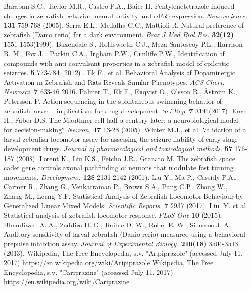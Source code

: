 \documentclass[a4paper,12pt]{article}
\begin{document}
\begin{thebibliography}{99}
Baraban S.C., Taylor M.R., Castro P.A., Baier H. Pentylenetetrazole induced changes in zebrafish behavior, neural activity and c-FoS expression. \textit{Neuroscience.} \textbf{131} 759-768 (2005).
Serra E.L., Medalha C.C., Mattioli R. Natural preference of zebrafish (Danio rerio) for a dark environment. \textit{Braz J Med Biol Res.} \textbf{32(12)} 1551-1553(1999). 
Baxendale S., Holdsworth C.J., Meza Santoscoy P.L., Harrison R. M., Fox J. , Parkin C.A., Ingham P.W., Cunliffe P.W., Identification of compounds with anti-convulsant properties in a zebrafish model of epileptic seizures.  \textbf{5} 773-784 (2012) .
Ek F., et al. Behavioral Analysis of Dopaminergic Activation in Zebrafish and Rats Reveals Similar Phenotypes. \textit{ACS Chem. Neurosci.} \textbf{7} 633-46 2016.
Palmer T., Ek F., Enqvist O., Olsson R., Åström K., Petersson P. Action sequencing in the spontaneous swimming behavior of zebrafish larvae - implications for drug development. \textit{Sci Rep.} \textbf{7} 3191(2017). 
Korn H., Faber D.S. The Mauthner cell half a century later: a neurobiological model for decision-making? \textit{Neuron.} \textbf{47} 13-28 (2005).
Winter M.J., et al. Validation of a larval zebrafish locomotor assay for assessing the seizure liability of early-stage development drugs. \textit{Journal of pharmacological and toxicological methods.} \textbf{57} 176-187 (2008). 
Lorent K., Liu K.S., Fetcho J.R., Granato M. The zebrafish space cadet gene controls axonal pathfinding of neurons that modulate fast turning movements. \textit{Development.} \textbf{128} 2131-2142 (2001).
Liu Y., Ma P., Cassidy P.A., Carmer R., Zhang G., Venkatraman P., Brown S.A., Pang C.P., Zhong W., Zhang M., Leung Y.F. Statistical Analysis of Zebrafish Locomotor Behaviour by Generalized Linear Mixed Models. \textit{Scientific Reports.} \textbf{7} 2937 (2017).
Liu, Y. et al. Statistical analysis of zebrafish locomotor response. \textit{PLoS One} \textbf{10} (2015).
Bhandiwad A. A., Zeddies D. G., Raible D. W., Rubel E. W., Sisneros J. A. Auditory sensitivity of larval zebrafish (Danio rerio) measured using a behavioral prepulse inhibition assay. \textit{Journal of Experimental Biology.} \textbf{216(18)} 3504-3513 (2013).
Wikipedia, The Free Encyclopedia, s.v.  "Aripiprazole" (accessed July 11, 2017) https://en.wikipedia.org/wiki/Aripiprazole
Wikipedia, The Free Encyclopedia, s.v.  "Cariprazine" (accessed July 11, 2017) https://en.wikipedia.org/wiki/Cariprazine

\end{thebibliography}
\end{document}
